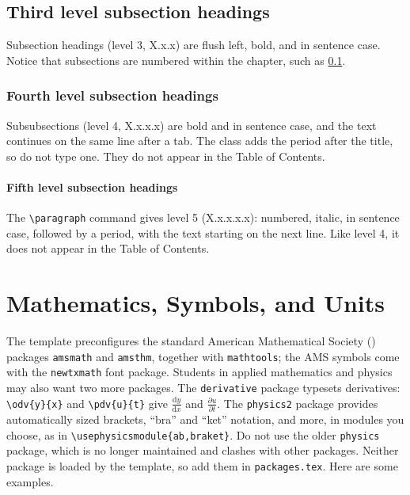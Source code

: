 \subsection{Third level subsection headings}
\label{subsec:subsections}
Subsection headings (level 3, X.x.x) are flush left, bold, and in sentence case. Notice that subsections are numbered within the chapter, such as \cref{subsec:subsections}.

\subsubsection{Fourth level subsection headings}
\label{subsubsec:subsubsections}
Subsubsections (level 4, X.x.x.x) are bold and in sentence case, and the text continues on the same line after a tab. The class adds the period after the title, so do not type one. They do not appear in the Table of Contents.

\paragraph{Fifth level subsection headings}
The \verb+\paragraph+ command gives level 5 (X.x.x.x.x): numbered, italic, in sentence case, followed by a period, with the text starting on the next line. Like level 4, it does not appear in the Table of Contents.

\section{Mathematics, Symbols, and Units}
\label{sec:math}

The template preconfigures the standard American Mathematical Society (\AmS) packages \texttt{amsmath} and \texttt{amsthm}, together with \texttt{mathtools}; the AMS symbols come with the \texttt{newtxmath} font package. Students in applied mathematics and physics may also want two more packages. The \texttt{derivative} package typesets derivatives: \verb+\odv{y}{x}+ and \verb+\pdv{u}{t}+ give $\frac{\mathrm{d}y}{\mathrm{d}x}$ and $\frac{\partial u}{\partial t}$. The \texttt{physics2} package provides automatically sized brackets, ``bra'' and ``ket'' notation, and more, in modules you choose, as in \verb+\usephysicsmodule{ab,braket}+. Do not use the older \texttt{physics} package, which is no longer maintained and clashes with other packages. Neither package is loaded by the template, so add them in \texttt{packages.tex}. Here are some examples.

